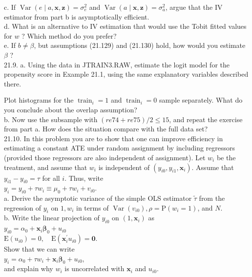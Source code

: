 \documentclass[10pt]{article}
\begin{document}
c. If $\operatorname{Var}(e \mid a, \mathbf{x}, \mathbf{z})=\sigma_{e}^{2}$ and $\operatorname{Var}(a \mid \mathbf{x}, \mathbf{z})=\sigma_{a}^{2}$, argue that the IV estimator from part b is asymptotically efficient.\\
d. What is an alternative to IV estimation that would use the Tobit fitted values for $w$ ? Which method do you prefer?\\
e. If $b \neq \beta$, but assumptions (21.129) and (21.130) hold, how would you estimate $\beta$ ?\\
21.9. a. Using the data in JTRAIN3.RAW, estimate the logit model for the propensity score in Example 21.1, using the same explanatory variables described there.

Plot histograms for the $\operatorname{train}_{i}=1$ and $\operatorname{train}_{i}=0$ sample separately. What do you conclude about the overlap assumption?\\
b. Now use the subsample with $(r e 74+r e 75) / 2 \leq 15$, and repeat the exercise from part a. How does the situation compare with the full data set?\\
21.10. In this problem you are to show that one can improve efficiency in estimating a constant ATE under random assignment by including regressors (provided those regressors are also independent of assignment). Let $w_{i}$ be the treatment, and assume that $w_{i}$ is independent of $\left(y_{i 0}, y_{i 1}, \mathbf{x}_{i}\right)$. Assume that $y_{i 1}-y_{i 0}=\tau$ for all $i$. Thus, write\\
$y_{i}=y_{i 0}+\tau w_{i} \equiv \mu_{0}+\tau w_{i}+v_{i 0}$.\\
a. Derive the asymptotic variance of the simple OLS estimator $\tilde{\tau}$ from the regression of $y_{i}$ on $1, w_{i}$ in terms of $\operatorname{Var}\left(v_{i 0}\right), \rho=\mathrm{P}\left(w_{i}=1\right)$, and $N$.\\
b. Write the linear projection of $y_{i 0}$ on $\left(1, \mathbf{x}_{i}\right)$ as\\
$y_{i 0}=\alpha_{0}+\mathbf{x}_{i} \boldsymbol{\beta}_{0}+u_{i 0}$\\
$\mathrm{E}\left(u_{i 0}\right)=0, \quad \mathrm{E}\left(\mathbf{x}_{i}^{\prime} u_{i 0}\right)=\mathbf{0}$.\\
Show that we can write\\
$y_{i}=\alpha_{0}+\tau w_{i}+\mathbf{x}_{i} \boldsymbol{\beta}_{0}+u_{i 0}$,\\
and explain why $w_{i}$ is uncorrelated with $\mathbf{x}_{i}$ and $u_{i 0}$.\\
\end{document}
